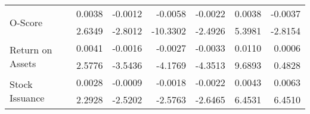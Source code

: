 \documentclass[a4paper]{article}                 %
\begin{document}
\begin{table}[h]
{\begin{tabular}{@{}lrrrrrr@{}}
    \multirow{2}{*}{O-Score} & 0.0038 & -0.0012 & -0.0058 & -0.0022 & 0.0038 & -0.0037 \\
     & 2.6349 & -2.8012 & -10.3302 & -2.4926 & 5.3981 & -2.8154 \\
    \multirow{2}{*}{Return on Assets} & 0.0041 & -0.0016 & -0.0027 & -0.0033 & 0.0110 & 0.0006 \\
     & 2.5776 & -3.5436 & -4.1769 & -4.3513 & 9.6893 & 0.4828 \\
    \multirow{2}{*}{Stock Issuance} & 0.0028 & -0.0009 & -0.0018 & -0.0022 & 0.0043 & 0.0063 \\
     & 2.2928 & -2.5202 & -2.5763 & -2.6465 & 6.4531 & 6.4510 \\ \bottomrule
    \end{tabular}%
    }
\end{table}
\end{document}
